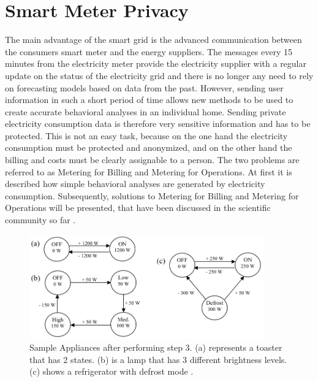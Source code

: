 \section{Smart Meter Privacy}
The main advantage of the smart grid is the advanced communication between the consumers smart meter and the energy suppliers. The messages every 15 minutes from the electricity meter provide the electricity supplier with a regular update on the status of the electricity grid and there is no longer any need to rely on forecasting models based on data from the past. However, sending user information in such a short period of time allows new methods to be used to create accurate behavioral analyses in an individual home. Sending private electricity consumption data is therefore very sensitive information and has to be protected. This is not an easy task, because on the one hand the electricity consumption must be protected and anonymized, and on the other hand the billing and costs must be clearly assignable to a person. The two problems are referred to as Metering for Billing and Metering for Operations. At first it is described how simple behavioral analyses are generated by electricity consumption. Subsequently, solutions to Metering for Billing and Metering for Operations will be presented, that have been discussed in the scientific community so far \cite{finster2014privacy}. \begin{figure}[htbp!]
  \centering
  \includegraphics[width=0.9\textwidth]{images/Appliance_Model.png}
  \caption[Appliance Model]{Sample Appliances after performing step 3. (a) represents a toaster that has 2 states. (b) is a lamp that has 3 different brightness levels. (c) shows a refrigerator with defrost mode \cite{quinn2009privacy}.}
  \label{fig:Appliance_Model}
\end{figure}
